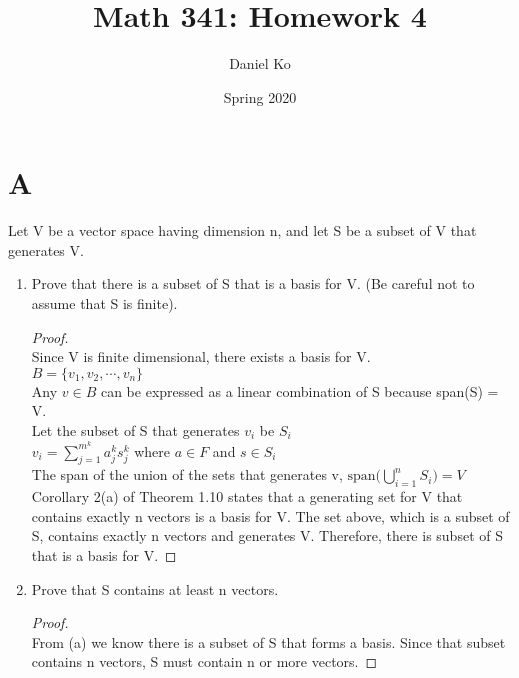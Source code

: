 \documentclass[11pt]{scrartcl}
\title{Math 341: Homework 4}
\author{Daniel Ko}
\date{Spring 2020}
\begin{document}
\maketitle

\section{A}
Let V be a vector space having dimension n, and let S be a subset of V that generates V.

\begin{enumerate}[label=\alph*.]
	\item{
			Prove that there is a subset of S that is a basis for V. (Be careful not to assume that S is finite).
			\begin{proof}
			\-\\
			Since V is finite dimensional, there exists a basis for V.\\
			$B = \{v_1, v_2, \cdots, v_n\}$\\
			Any $v \in B$ can be expressed as a linear combination of S because span(S) = V.\\
			Let the subset of S that generates $v_i$ be $S_i$\\
			$v_i = \sum_{j=1}^{m^k} a_j^k s_j^k$ where $a\in F$ and $s \in S_i$\\
			The span of the union of the sets that generates v, $\text{span(} \bigcup_{i=1}^{n}S_i \text{)} = V$\\ 
			Corollary 2(a) of Theorem 1.10 states that a generating set for V that contains exactly n vectors is a basis for V.
			The set above, which is a subset of S, contains exactly n vectors and generates V. Therefore, there is subset of S that is a basis for V. 
			\end{proof}

	}
	\item{
			Prove that S contains at least n vectors.
			\begin{proof}
			\-\\
			From (a) we know there is a subset of S that forms a basis. Since that subset contains n vectors, S must contain n or more vectors. 
			\end{proof}
		}
\end{enumerate}
\end{document}
